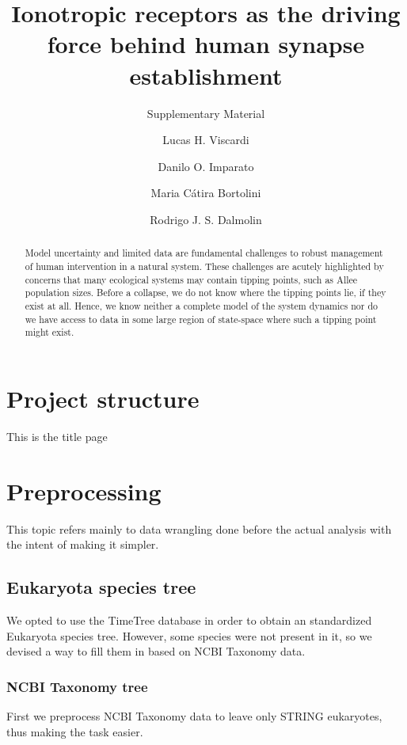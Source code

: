 \documentclass[
]{article}
\title{Ionotropic receptors as the driving force behind human synapse
establishment}
\subtitle{Supplementary Material}
\author{Lucas H. Viscardi \and Danilo O. Imparato \and Maria Cátira Bortolini \and Rodrigo J. S. Dalmolin}
\date{}
\begin{document}
\maketitle
\begin{abstract}
Model uncertainty and limited data are fundamental challenges to robust
management of human intervention in a natural system. These challenges
are acutely highlighted by concerns that many ecological systems may
contain tipping points, such as Allee population sizes. Before a
collapse, we do not know where the tipping points lie, if they exist at
all. Hence, we know neither a complete model of the system dynamics nor
do we have access to data in some large region of state-space where such
a tipping point might exist.
\end{abstract}

{
\setcounter{tocdepth}{3}
\tableofcontents
}
\hypertarget{project-structure}{%
\section{Project structure}\label{project-structure}}

This is the title page

\hypertarget{preprocessing}{%
\section{Preprocessing}\label{preprocessing}}

This topic refers mainly to data wrangling done before the actual
analysis with the intent of making it simpler.

\hypertarget{eukaryota-species-tree}{%
\subsection{Eukaryota species tree}\label{eukaryota-species-tree}}

We opted to use the TimeTree database in order to obtain an standardized
Eukaryota species tree. However, some species were not present in it, so
we devised a way to fill them in based on NCBI Taxonomy data.

\hypertarget{ncbi-taxonomy-tree}{%
\subsubsection{NCBI Taxonomy tree}\label{ncbi-taxonomy-tree}}

First we preprocess NCBI Taxonomy data to leave only STRING eukaryotes,
thus making the task easier. 
\end{document}
